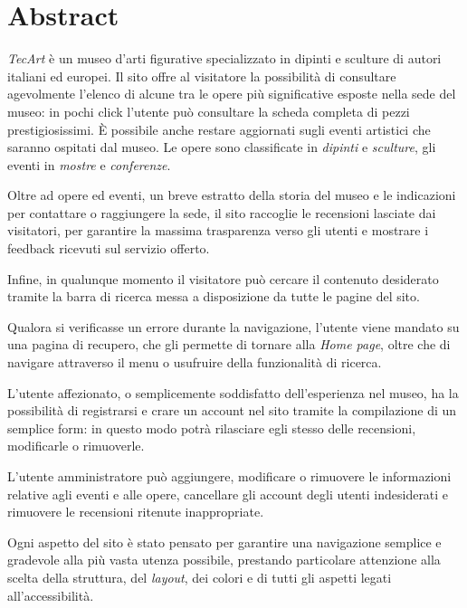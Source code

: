 \section{Abstract}
\label{abstract}
\textit{TecArt} è un museo d'arti figurative specializzato in dipinti e sculture di autori italiani ed europei. Il sito offre al visitatore la possibilità di consultare agevolmente l'elenco di alcune tra le opere più significative esposte nella sede del museo: in pochi click l'utente può consultare la scheda completa di pezzi prestigiosissimi. È possibile anche restare aggiornati sugli eventi artistici che saranno ospitati dal museo. Le opere sono classificate in \textit{dipinti} e \textit{sculture}, gli eventi in \textit{mostre} e \textit{conferenze}.

Oltre ad opere ed eventi, un breve estratto della storia del museo e le indicazioni per contattare o raggiungere la sede, il sito raccoglie le recensioni lasciate dai visitatori, per garantire la massima trasparenza verso gli utenti e mostrare i feedback ricevuti sul servizio offerto.

Infine, in qualunque momento il visitatore può cercare il contenuto desiderato tramite la barra di ricerca messa a disposizione da tutte le pagine del sito.

Qualora si verificasse un errore durante la navigazione, l'utente viene mandato su una pagina di recupero, che gli permette di tornare alla \textit{Home page}, oltre che di navigare attraverso il menu o usufruire della funzionalità di ricerca.

L'utente affezionato, o semplicemente soddisfatto dell'esperienza nel museo, ha la possibilità di registrarsi e crare un account nel sito tramite la compilazione di un semplice form: in questo modo potrà rilasciare egli stesso delle recensioni, modificarle o rimuoverle.

L'utente amministratore può aggiungere, modificare o rimuovere le informazioni relative agli eventi e alle opere, cancellare gli account degli utenti indesiderati e rimuovere le recensioni ritenute inappropriate.

Ogni aspetto del sito è stato pensato per garantire una navigazione semplice e gradevole alla più vasta utenza possibile, prestando particolare attenzione alla scelta della struttura, del \textit{layout}, dei colori e di tutti gli aspetti legati all'accessibilità.
